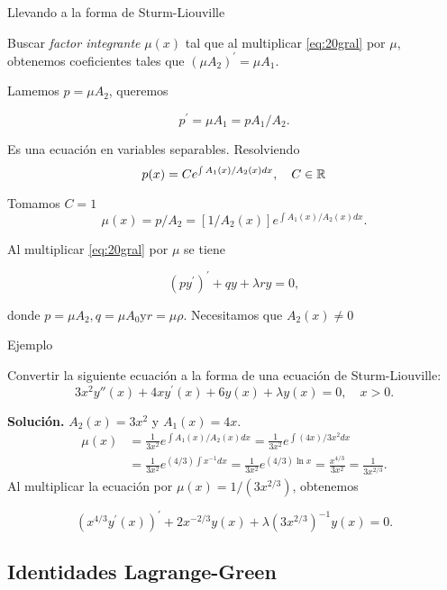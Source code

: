  



 

{Llevando a la forma de Sturm-Liouville}

 Buscar
 \emph{factor integrante} $\mu(x)$ tal que al multiplicar \eqref{eq:20gral} por $\mu$,  obtenemos coeficientes tales que  $\left(\mu A_{2}\right)^{\prime}=\mu A_{1}$. 
 
 
 Lamemos $p=\mu A_{2}$,  queremos 
 
 $$p^{\prime}=\mu A_{1}=p A_{1} / A_{2}.$$
 
 Es una ecuación en variables separables. Resolviendo
$$
p(x)=C e^{\int A_{1}(x) / A_{2}( x) d x},\quad C\in\rr
$$

Tomamos $C=1$ 
$$\mu(x)=p / A_{2}=\left[1 / A_{2}(x)\right] e^{\int A_{1}(x) / A_{2}(x) d x}.$$

Al multiplicar \eqref{eq:20gral} por  $\mu$ se tiene

$$\left(p y^{\prime}\right)^{\prime}+q y+\lambda r y=0,$$

donde $p=\mu A_{2}, q=\mu A_{0} \mathrm{y} r=\mu \rho$. Necesitamos  que $A_{2}(x)\neq 0$



 



 

{Ejemplo}
 
 Convertir la siguiente ecuación a la forma de una ecuación de Sturm-Liouville:
$$
 3 x^{2} y''(x)+4 x y^{\prime}(x)+6 y(x)+\lambda y(x)=0, \quad x>0.
$$


\textbf{Solución.}  $A_{2}(x)=3 x^{2}$ y $A_{1}(x)=4 x$.
$$
\begin{aligned}
\mu(x) &=\frac{1}{3 x^{2}} e^{\int A_1(x) / A_2(x) d x}=\frac{1}{3 x^{2}} e^{\int(4 x)/3 x^{2} d x} \\
&=\frac{1}{3 x^{2}} e^{(4 / 3) \int x^{-1} d x}=\frac{1}{3 x^{2}} e^{(4 / 3) \ln x}=\frac{x^{4 / 3}}{3 x^{2}}=\frac{1}{3 x^{2 / 3}} .
\end{aligned}
$$
Al multiplicar la ecuación por $\mu(x)=1 /\left(3 x^{2 / 3}\right)$, obtenemos

$$\left(x^{4 / 3} y^{\prime}(x)\right)^{\prime}+2 x^{-2 / 3} y(x)+\lambda\left(3 x^{2 / 3}\right)^{-1} y(x)=0.$$



 


\subsection{Identidades Lagrange-Green}
 

